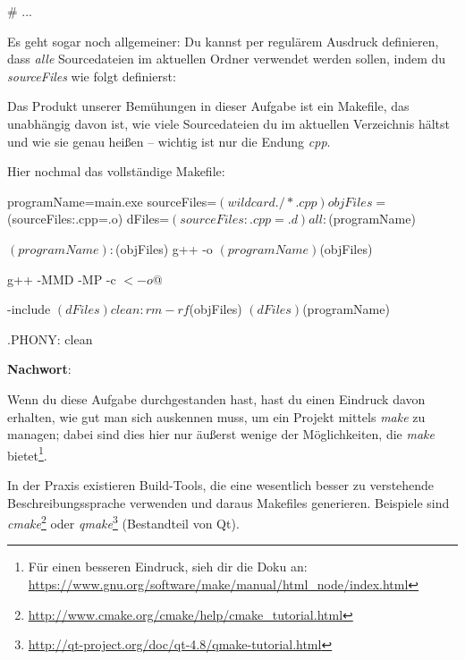 \begin{enumerate}
\begin{lstmake}
# ...
\end{lstmake}

Es geht sogar noch allgemeiner:
Du kannst per regulärem Ausdruck definieren, dass \emph{alle} Sourcedateien im aktuellen Ordner verwendet werden sollen, indem du \emph{sourceFiles} wie folgt definierst:


\end{enumerate}

Das Produkt unserer Bemühungen in dieser Aufgabe ist ein Makefile, das unabhängig davon ist, wie viele Sourcedateien du im aktuellen Verzeichnis hältst und wie sie genau heißen -- wichtig ist nur die Endung \emph{cpp}.

Hier nochmal das vollständige Makefile:
\begin{lstmake}
programName=main.exe
sourceFiles=$(wildcard ./*.cpp)
objFiles=$(sourceFiles:.cpp=.o)
dFiles=$(sourceFiles:.cpp=.d)

all: $(programName)

$(programName): $(objFiles)
	g++ -o $(programName) $(objFiles)

	g++ -MMD -MP -c $< -o $@

-include $(dFiles)

clean:
	rm -rf $(objFiles) $(dFiles) $(programName)

.PHONY: clean
\end{lstmake}

\textbf{Nachwort}:

Wenn du diese Aufgabe durchgestanden hast, hast du einen Eindruck davon erhalten, wie gut man sich auskennen muss, um ein Projekt mittels \emph{make} zu managen;
dabei sind dies hier nur äußerst wenige der Möglichkeiten, die \emph{make} bietet\footnote{Für einen besseren Eindruck, sieh dir die Doku an: \url{https://www.gnu.org/software/make/manual/html_node/index.html}}.

In der Praxis existieren Build-Tools, die eine wesentlich besser zu verstehende Beschreibungssprache verwenden und daraus Makefiles generieren.
Beispiele sind \emph{cmake}\footnote{\url{http://www.cmake.org/cmake/help/cmake_tutorial.html}} oder \emph{qmake}\footnote{\url{http://qt-project.org/doc/qt-4.8/qmake-tutorial.html}} (Bestandteil von Qt).




